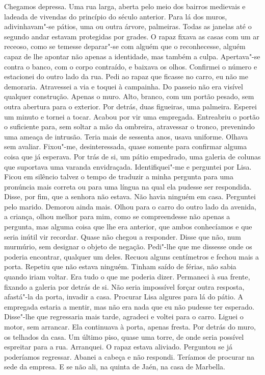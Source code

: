 Chegamos depressa. Uma rua larga, aberta pelo meio dos bairros medievais
e ladeada de vivendas do princípio do século anterior. Para lá dos
muros, adivinhavam"-se pátios, uma ou outra árvore, palmeiras. Todas as
janelas até o segundo andar estavam protegidas por grades. O rapaz
fixava as casas com um ar receoso, como se temesse deparar"-se com
alguém que o reconhecesse, alguém capaz de lhe apontar não apenas a
identidade, mas também a culpa. Apertava"-se contra o banco, com o corpo
contraído, e baixava os olhos. Confirmei o número e estacionei do outro
lado da rua. Pedi ao rapaz que ficasse no carro, eu não me demoraria.
Atravessei a via e toquei à campainha. Do passeio não era visível
qualquer construção. Apenas o muro. Alto, branco, com um portão pesado,
sem outra abertura para o exterior. Por detrás, duas figueiras, uma
palmeira. Esperei um minuto e tornei a tocar. Acabou por vir uma
empregada. Entreabriu o portão o suficiente para, sem soltar a mão da
ombreira, atravessar o tronco, prevenindo uma ameaça de intrusão. Teria
mais de sessenta anos, usava uniforme. Olhava sem avaliar. Fixou"-me,
desinteressada, quase somente para confirmar alguma coisa que já
esperava. Por trás de si, um pátio empedrado, uma galeria de colunas que
suportava uma varanda envidraçada. Identifiquei"-me e perguntei por
Lisa. Ficou em silêncio talvez o tempo de traduzir a minha pergunta para
uma pronúncia mais correta ou para uma língua na qual ela pudesse ser
respondida. Disse, por fim, que a senhora não estava. Não havia ninguém
em casa. Perguntei pelo marido. Demorou ainda mais. Olhou para o carro
do outro lado da avenida, a criança, olhou melhor para mim, como se
compreendesse não apenas a pergunta, mas alguma coisa que lhe era
anterior, que ambos conhecíamos e que seria inútil vir recordar. Quase
não chegou a responder. Disse que não, num murmúrio, sem designar o
objeto de negação. Pedi"-lhe que me dissesse onde os poderia encontrar,
qualquer um deles. Recuou alguns centímetros e fechou mais a porta.
Repetiu que não estava ninguém. Tinham saído de férias, não sabia quando
iriam voltar. Era tudo o que me poderia dizer. Permaneci à sua frente,
fixando a galeria por detrás de si. Não seria impossível forçar outra
resposta, afastá"-la da porta, invadir a casa. Procurar Lisa algures
para lá do pátio. A empregada estaria a mentir, mas não era nada que eu
não pudesse ter esperado. Disse"-lhe que regressaria mais tarde,
agradeci e voltei para o carro. Liguei o motor, sem arrancar. Ela
continuava à porta, apenas fresta. Por detrás do muro, os telhados da
casa. Um último piso, quase uma torre, de onde seria possível espreitar
para a rua. Arranquei. O rapaz estava aliviado. Perguntou se já
poderíamos regressar. Abanei a cabeça e não respondi. Teríamos de
procurar na sede da empresa. E se não ali, na quinta de Jaén, na casa de
Marbella.

